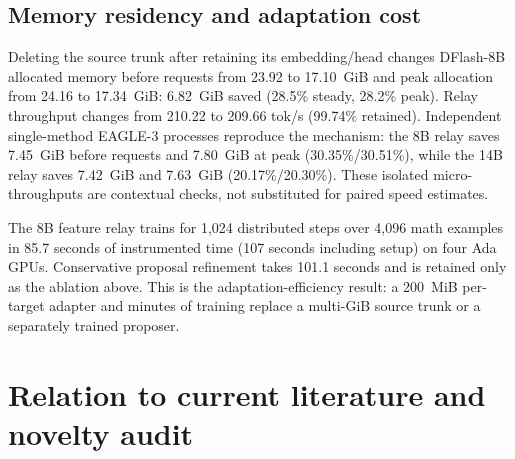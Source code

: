 \documentclass[10pt]{article}
\begin{document}
\subsection{Memory residency and adaptation cost}

Deleting the source trunk after retaining its embedding/head changes DFlash-8B
allocated memory before requests from 23.92 to 17.10~GiB and peak allocation
from 24.16 to 17.34~GiB: 6.82~GiB saved (28.5\% steady, 28.2\% peak). Relay
throughput changes from 210.22 to 209.66 tok/s (99.74\% retained). Independent
single-method EAGLE-3 processes reproduce the mechanism: the 8B relay saves
7.45~GiB before requests and 7.80~GiB at peak (30.35\%/30.51\%), while the 14B
relay saves 7.42~GiB and 7.63~GiB (20.17\%/20.30\%). These isolated
micro-throughputs are contextual checks, not substituted for paired speed
estimates.

The 8B feature relay trains for 1,024 distributed steps over 4,096 math
examples in 85.7 seconds of instrumented time (107 seconds including setup) on
four Ada GPUs. Conservative proposal refinement takes 101.1 seconds and is
retained only as the ablation above. This is
the adaptation-efficiency result: a 200~MiB per-target adapter and minutes of
training replace a multi-GiB source trunk or a separately trained proposer.

\section{Relation to current literature and novelty audit}
\end{document}
